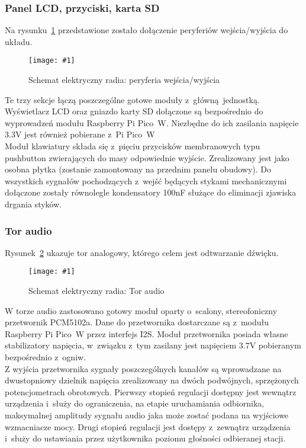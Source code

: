 \documentclass[polish]{aghengthesis}
\newcommand{\imgint}[4]{
	\begin{figure}[{#4}]
		\centering
		\texttt{[image: \#1]}
		\caption{#2}
		\label{#1}
	\end{figure}
}
\newcommand{\imgh}[3]{\imgint{#1}{#2}{#3}{H}}
\begin{document}
			\subsubsection{Panel LCD, przyciski, karta SD}
				Na rysunku~\ref{3/hw_kicad_sch_perip} przedstawione zostało dołączenie peryferiów wejścia/wyjścia do układu.
				\imgh{3/hw_kicad_sch_perip}{Schemat elektryczny radia: peryferia wejścia/wyjścia}{0.95}
				
				Te trzy sekcje łączą poszczególne gotowe moduły z~główną jednostką.
				Wyświetlacz LCD oraz gniazdo karty SD dołączone są bezpośrednio do wyprowadzeń modułu Raspberry Pi Pico~W. Niezbędne do ich zasilania napięcie 3.3V jest również pobierane z~Pi Pico~W
				$ $\\
				
				Moduł klawiatury składa się z~pięciu przycisków membranowych typu pushbutton zwierających do masy odpowiednie wyjście. Zrealizowany jest jako osobna płytka (zostanie zamontowany na przednim panelu obudowy).  Do wszystkich sygnałów pochodzących z~wejść będących stykami mechanicznymi dołączone zostały równolegle kondensatory 100nF służące do eliminacji zjawiska drgania styków.
				\pagebreak
				
			\subsubsection{Tor audio}
				Rysunek~\ref{3/hw_kicad_sch_audio} ukazuje tor analogowy, którego celem jest odtwarzanie dźwięku.
				\imgh{3/hw_kicad_sch_audio}{Schemat elektryczny radia: Tor audio}{0.95}
				
				W torze audio zastosowano gotowy moduł oparty o~scalony, stereofoniczny przetwornik PCM5102a\textsuperscript{\cite{hw_dac}}. Dane do przetwornika dostarczane są z~modułu Raspberry Pi Pico~W przez interfejs I2S. Moduł przetwornika posiada własne stabilizatory napięcia, w~związku z~tym zasilany jest napięciem 3.7V pobieranym bezpośrednio z~ogniw.
				$ $\\
				
				Z wyjścia przetwornika sygnały poszczególnych kanałów są wprowadzane na dwustopniowy dzielnik napięcia zrealizowany na dwóch podwójnych, sprzężonych potencjometrach obrotowych. Pierwszy stopień regulacji dostępny jest wewnątrz urządzenia i~służy do ograniczenia, na etapie uruchamiania odbiornika, maksymalnej amplitudy sygnału audio jaka może zostać podana na wyjściowe wzmacniacze mocy. Drugi stopień regulacji jest dostępy z~zewnątrz urządzenia i~służy do ustawiania przez użytkownika poziomu głośności odbieranej stacji. 
				$ $\\
				
\end{document}
